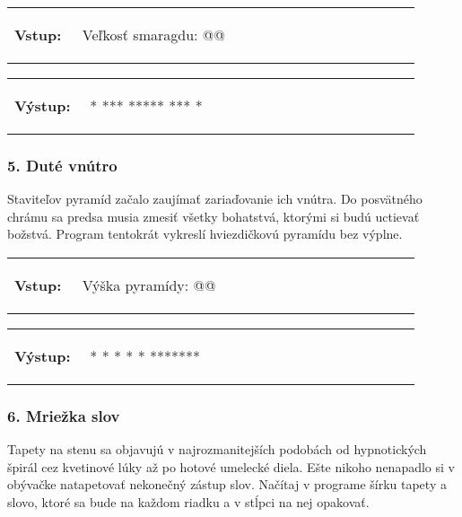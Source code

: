 \begin{tabular}{@{}p{0.15\linewidth}p{0.75\linewidth}}
\textbf{\small Vstup:} &
\vspace{-3em}
\begin{code}
Veľkosť smaragdu: @\fbox{5}@
\end{code}
\end{tabular}

\vspace{-2em}
\begin{tabular}{@{}p{0.15\linewidth}p{0.75\linewidth}}
\textbf{\small Výstup:} &
\vspace{-3em}
\begin{code}
  *
 ***
*****
 ***
  *
\end{code}
\end{tabular}
\vspace{-2em}

\subsubsection*{5. Duté vnútro}
Staviteľov pyramíd začalo zaujímať zariaďovanie ich vnútra. Do posvätného chrámu sa predsa musia zmesiť všetky bohatstvá, ktorými si budú uctievať božstvá. Program tentokrát vykreslí hviezdičkovú pyramídu bez výplne.

\begin{tabular}{@{}p{0.15\linewidth}p{0.75\linewidth}}
\textbf{\small Vstup:} &
\vspace{-3em}
\begin{code}
Výška pyramídy: @\fbox{4}@
\end{code}
\end{tabular}

\vspace{-2em}
\begin{tabular}{@{}p{0.15\linewidth}p{0.75\linewidth}}
\textbf{\small Výstup:} &
\vspace{-3em}
\begin{code}
   *
  * *
 *   *
*******
\end{code}
\end{tabular}
\vspace{-2em}


\subsubsection*{6. Mriežka slov}
Tapety na stenu sa objavujú v najrozmanitejších podobách od hypnotických špirál cez kvetinové lúky až po hotové umelecké diela. Ešte nikoho nenapadlo si v obývačke natapetovať nekonečný zástup slov. Načítaj v programe šírku tapety a slovo, ktoré sa bude na každom riadku a v stĺpci na nej opakovať.

